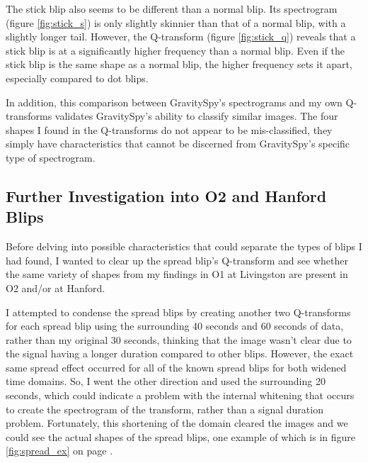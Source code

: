 \documentclass[a4paper]{article}
\begin{document}
The stick blip also seems to be different than a normal blip. Its spectrogram (figure \ref{fig:stick_s}) is only slightly skinnier than that of a normal blip, with a slightly longer tail. However, the Q-transform (figure \ref{fig:stick_q}) reveals that a stick blip is at a significantly higher frequency than a normal blip. Even if the stick blip is the same shape as a normal blip, the higher frequency sets it apart, especially compared to dot blips.

In addition, this comparison between GravitySpy's spectrograms and my own Q-transforms validates GravitySpy's ability to classify similar images. The four shapes I found in the Q-transforms do not appear to be mis-classified, they simply have characteristics that cannot be discerned from GravitySpy's specific type of spectrogram.

\subsection{Further Investigation into O2 and Hanford Blips} \label{O2}

Before delving into possible characteristics that could separate the types of blips I had found, I wanted to clear up the spread blip's Q-transform and see whether the same variety of shapes from my findings in O1 at Livingston are present in O2 and/or at Hanford.

I attempted to condense the spread blips by creating another two Q-transforms for each spread blip using the surrounding 40 seconds and 60 seconds of data, rather than my original 30 seconds, thinking that the image wasn't clear due to the signal having a longer duration compared to other blips. However, the exact same spread effect occurred for all of the known spread blips for both widened time domains. So, I went the other direction and used the surrounding 20 seconds, which could indicate a problem with the internal whitening that occurs to create the spectrogram of the transform, rather than a signal duration problem. Fortunately, this shortening of the domain cleared the images and we could see the actual shapes of the spread blips, one example of which is in figure \ref{fig:spread_ex} on page \pageref{fig:spread_ex}.
\end{document}
